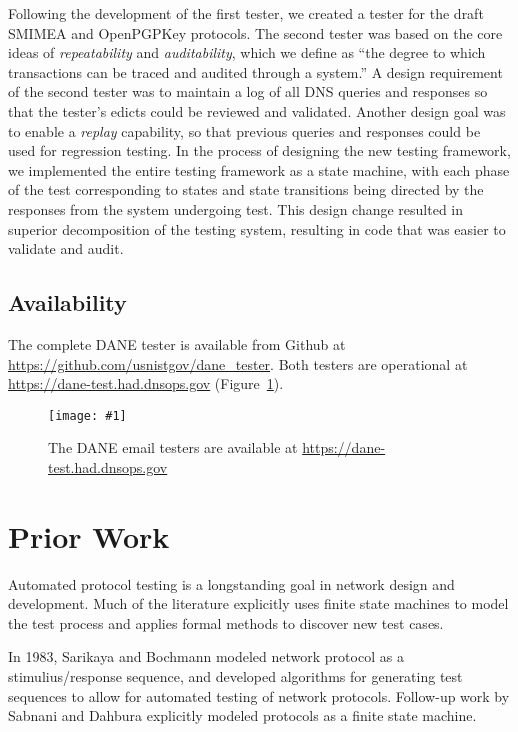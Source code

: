 \documentclass[preprint,3p,11pt]{elsarticle}
\begin{document}
Following the development of the first tester, we created a
tester for the draft SMIMEA and OpenPGPKey protocols. The second
tester was based on the core ideas of \emph{repeatability} and \emph{auditability},
which we define as ``the degree to which transactions can be traced
and audited through a system.'' A design requirement of the second tester  was to maintain a log of all DNS queries and responses
so that the tester's edicts could be reviewed and validated. Another
design goal was to enable a \emph{replay} capability, so that previous
queries and responses could be used for regression testing. In the
process of designing the new testing framework, we implemented the entire
testing framework as a state machine, with each phase
of the test corresponding to states and state transitions being
directed by the responses from the system undergoing test. This design
change resulted in superior decomposition of the testing system,
resulting in code that was easier to validate and audit.

\subsection{Availability}

The complete DANE tester is available from Github at
\url{https://github.com/usnistgov/dane_tester}. Both testers are
operational at \url{https://dane-test.had.dnsops.gov} (Figure~\ref{tester-home}).

\newcommand\sgraphic[2]{
\begin{figure}
\begin{center}
\texttt{[image: \#1]}
\end{center}
\caption{#2}\label{#1}
\end{figure}
}

\sgraphic{tester-home}{The DANE email testers are available at \url{https://dane-test.had.dnsops.gov}}

\section{Prior Work}
Automated protocol testing is a longstanding goal in network design
and development. Much of the literature explicitly uses finite state
machines to model the test process and applies formal methods to
discover new test cases.

In 1983, Sarikaya and Bochmann modeled network protocol as a
stimulius/response sequence, and developed algorithms for generating
test sequences to allow for automated testing of network
protocols\cite{Sarikaya:1983:SIP:1024840.1035264,Sarikaya:1983:SIP:1035237.1035264}.
Follow-up work by Sabnani and Dahbura explicitly modeled protocols as
a finite state machine\cite{Sabnani:1985:NTG:319056.319003,Sabnani:1985:NTG:318951.319003}.
\end{document}
